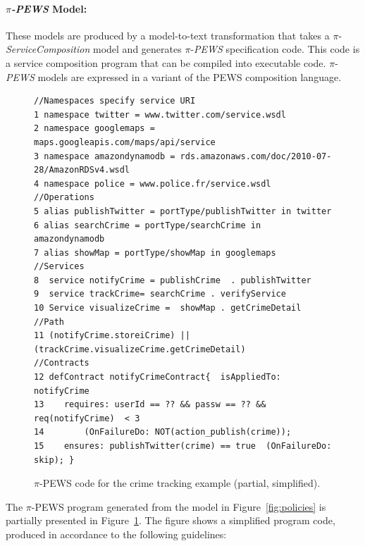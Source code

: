 \paragraph*{$\pi$\textit{-PEWS} Model:}
These models are produced by a model-to-text transformation that takes a $\pi$-\textit{ServiceComposition} model and generates $\pi$-\textit{PEWS} specification code.
This code is a service composition program that can be compiled into executable code.
$\pi$-\textit{PEWS} models are expressed in a variant of the PEWS composition language.
\begin{figure}[t]
\begin{small}
\begin{verbatim}
//Namespaces specify service URI
1 namespace twitter = www.twitter.com/service.wsdl
2 namespace googlemaps = maps.googleapis.com/maps/api/service
3 namespace amazondynamodb = rds.amazonaws.com/doc/2010-07-28/AmazonRDSv4.wsdl
4 namespace police = www.police.fr/service.wsdl
//Operations 
5 alias publishTwitter = portType/publishTwitter in twitter
6 alias searchCrime = portType/searchCrime in amazondynamodb 
7 alias showMap = portType/showMap in googlemaps 
//Services
8  service notifyCrime = publishCrime  . publishTwitter 
9  service trackCrime= searchCrime . verifyService
10 Service visualizeCrime =  showMap . getCrimeDetail
//Path
11 (notifyCrime.storeiCrime) || (trackCrime.visualizeCrime.getCrimeDetail)
//Contracts
12 defContract notifyCrimeContract{  isAppliedTo: notifyCrime
13	  requires: userId == ?? && passw == ?? && req(notifyCrime)  < 3
14 	      (OnFailureDo: NOT(action_publish(crime));
15	  ensures: publishTwitter(crime) == true  (OnFailureDo: skip); }
\end{verbatim}
\end{small}
\caption{$\pi$-PEWS code for the crime tracking example (partial, simplified).\label{fig:pewscontract} }
\end{figure}
The $\pi$-PEWS program generated from the model in Figure~\ref{fig:policies} is partially presented in Figure~\ref{fig:pewscontract}. 
The figure shows a simplified program code, produced in accordance to the following guidelines:
